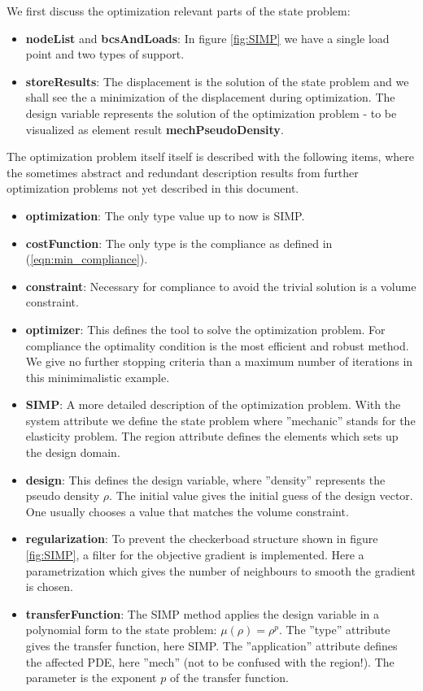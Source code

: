 We first discuss the optimization relevant parts of the state problem:
\begin{itemize}
\item \textbf{nodeList} and \textbf{bcsAndLoads}: In figure \ref{fig:SIMP} we have a single load point and two types of support.
\item \textbf{storeResults}: The displacement is the solution of the state problem and we shall see the a minimization of the displacement during optimization. The design variable represents the solution of the optimization problem - to be visualized as element result \textbf{mechPseudoDensity}.
\end{itemize}

The optimization problem itself itself is described with the following items, where
the sometimes abstract and redundant description results from further optimization
problems not yet described in this document.
\begin{itemize}
\item \textbf{optimization}: The only type value up to now is SIMP.
\item \textbf{costFunction}: The only type is the compliance as defined in (\ref{eqn:min_compliance}).
\item \textbf{constraint}: Necessary for compliance to avoid the trivial solution is
a volume constraint.
\item \textbf{optimizer}: This defines the tool to solve the optimization problem. For compliance the optimality condition is the most efficient and robust method. We give
no further stopping criteria than a maximum number of iterations in this minimimalistic example.
\item \textbf{SIMP}: A more detailed description of the optimization problem. With
the system attribute we define the state problem where ''mechanic'' stands for the elasticity problem. The region attribute defines the elements which sets up the design domain.
\item \textbf{design}: This defines the design variable, where ''density'' represents the pseudo density $\rho$. The initial value gives the initial guess of the design vector. One usually chooses a value that matches the volume constraint.
\item \textbf{regularization}: To prevent the checkerboad structure shown in figure \ref{fig:SIMP}, a filter for the objective gradient is implemented. Here a parametrization which gives the number of neighbours to smooth the gradient is chosen.
\item \textbf{transferFunction}: The SIMP method applies the design variable in a polynomial form to the state problem: $\mu(\rho) = \rho^p$. The ''type'' attribute gives the transfer function, here SIMP. The ''application'' attribute defines the affected PDE, here ''mech'' (not to be confused with the region!). The parameter is the exponent $p$ of the transfer function. 
\end{itemize}

